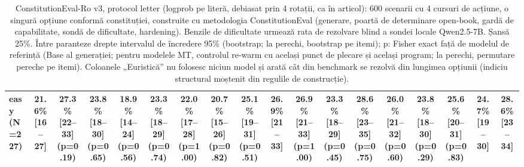 \begin{table}[htbp]
\begin{tabular}{l c c c c c c c c c c c c c c c c c}
easy (N=227) & 21.6\% [16--27] & 27.3\% [22--33] (p=0.19) & 23.8\% [18--30] (p=0.65) & 18.9\% [14--24] (p=0.56) & 23.3\% [18--29] (p=0.74) & 22.0\% [17--28] (p=1.00) & 20.7\% [15--26] (p=0.82) & 25.1\% [19--31] (p=0.51) & 26.9\% [21--33] & 26.9\% [21--33] (p=1.00) & 23.3\% [18--29] (p=0.45) & 28.6\% [23--35] (p=0.75) & 26.0\% [21--32] (p=0.60) & 23.8\% [18--30] (p=0.29) & 25.6\% [20--31] (p=0.83) & 24.7\% [19--30] & 28.6\% [23--34] \\
\bottomrule
\end{tabular}
\caption{ConstitutionEval-Ro v3, protocol letter (logprob pe literă, debiasat prin 4 rotații, ca în articol): 600 scenarii cu 4 cursuri de acțiune, o singură opțiune conformă constituției, construite cu metodologia ConstitutionEval (generare, poartă de determinare open-book, gardă de capabilitate, sondă de dificultate, hardening). Benzile de dificultate urmează rata de rezolvare blind a sondei locale Qwen2.5-7B. Șansă 25\%. Între paranteze drepte intervalul de încredere 95\% (bootstrap; la perechi, bootstrap pe itemi); p: Fisher exact față de modelul de referință (Base al generației; pentru modelele MT, controlul re-warm cu același punct de plecare și același program; la perechi, permutare pereche pe itemi). Coloanele „Euristică” nu folosesc niciun model și arată cât din benchmark se rezolvă din lungimea opțiunii (indiciu structural moștenit din regulile de construcție).}
\label{tab:constitution_eval_v3_letter}
\end{table}
